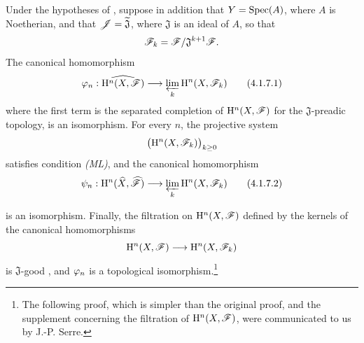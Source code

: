 \begin{corollary}[4.1.7]
\label{III.4.1.7}
Under the hypotheses of , suppose in addition that
$Y=\operatorname{Spec}(A)$, where $A$ is Noetherian, and that
$\mathscr{J}=\widetilde{\mathfrak{J}}$, where $\mathfrak{J}$ is an ideal
of $A$, so that
\[
  \mathscr{F}_k=\mathscr{F}/\mathfrak{J}^{k+1}\mathscr{F}.
\]
The canonical homomorphism
\[
  \varphi_n:
  \widehat{\mathrm{H}^n(X,\mathscr{F})}
  \longrightarrow
  \varprojlim_k\mathrm{H}^n(X,\mathscr{F}_k)
  \tag{4.1.7.1}
  \label{III.4.1.7.1}
\]
where the first term is the separated completion of
$\mathrm{H}^n(X,\mathscr{F})$ for the $\mathfrak{J}$-preadic topology, is an
isomorphism.
For every $n$, the projective system
\[
  \bigl(\mathrm{H}^n(X,\mathscr{F}_k)\bigr)_{k\geq0}
\]
satisfies condition \emph{(ML)}, and the canonical homomorphism
\[
  \psi_n:
  \mathrm{H}^n(\widehat{X},\widehat{\mathscr{F}})
  \longrightarrow
  \varprojlim_k\mathrm{H}^n(X,\mathscr{F}_k)
  \tag{4.1.7.2}
  \label{III.4.1.7.2}
\]


is an isomorphism.
Finally, the filtration on $\mathrm{H}^n(X,\mathscr{F})$ defined by the kernels
of the canonical homomorphisms
\[
  \mathrm{H}^n(X,\mathscr{F})\longrightarrow\mathrm{H}^n(X,\mathscr{F}_k)
\]
is $\mathfrak{J}$-good , and $\varphi_n$ is a
topological isomorphism.\footnote{The following proof, which is
simpler than the original proof, and the supplement concerning the
filtration of $\mathrm{H}^n(X,\mathscr{F})$, were communicated to us by
J.-P. Serre.}
\end{corollary}

